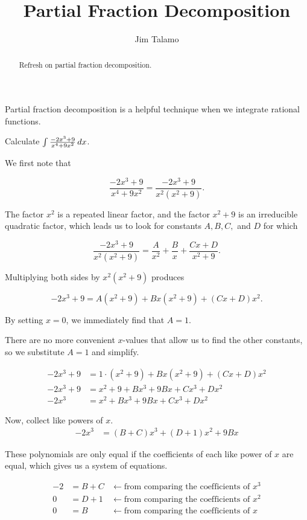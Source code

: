\documentclass{ximera}
\title[Refresh:]{Partial Fraction Decomposition}
\author{Jim Talamo}
\begin{document}
\begin{abstract}
 Refresh on partial fraction decomposition.
\end{abstract}
\maketitle


\begin{exercise}
Partial fraction decomposition is a helpful technique when we integrate rational functions. 

\begin{example}
Calculate $\int \frac{-2x^3+9}{x^4+9x^2} \mathop{}\!d x$.  

\begin{explanation}
We first note that 

\[
\frac{-2x^3+9}{x^4+9x^2} = \frac{-2x^3+9}{x^2(x^2+9)}.
\] 

The factor $x^2$ is a repeated linear factor, and the factor $x^2+9$ is an irreducible quadratic factor, which leads us to look for constants $A, B, C,$ and $D$ for which 

\[
\frac{-2x^3+9}{x^2(x^2+9)} = \frac{A}{x^2}+\frac{B}{x}+\frac{Cx+D}{x^2+9}.
\]

Multiplying both sides by $x^2(x^2+9)$ produces

\[
-2x^3+9 = A(x^2+9)+Bx(x^2+9)+(Cx+D)x^2.
\]

By setting $x=0$, we immediately find that $A=1$.

There are no more convenient $x$-values that allow us to find the other constants, so we substitute $A=1$ and simplify.

\begin{align*}
-2x^3+9 &= 1\cdot(x^2+9)+Bx(x^2+9)+(Cx+D)x^2 \\
-2x^3+9 &= x^2+9+Bx^3+9Bx+Cx^3+Dx^2 \\
-2x^3 &= x^2+Bx^3+9Bx+Cx^3+Dx^2
\end{align*}

Now, collect like powers of $x$.
\begin{align*}
-2x^3 &= (B+C)x^3 +(D+1)x^2 +9Bx
\end{align*}

These polynomials are only equal if the coefficients of each like power of $x$ are equal, which gives us a system of equations.

\begin{align*}
-2 & = B+C & \longleftarrow \textrm{from comparing the coefficients of } x^3 \\
0 & = D+1 & \longleftarrow  \textrm{from comparing the coefficients of } x^2 \\
0 & = B & \longleftarrow  \textrm{from comparing the coefficients of } x 
\end{align*}


\end{explanation}
\end{example}
\end{exercise}
\end{document}
